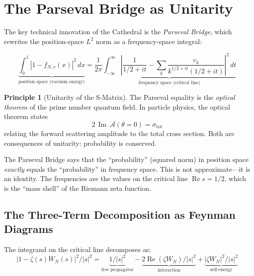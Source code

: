 \documentclass[11pt,a4paper]{article}
\theoremstyle{definition}
\newtheorem{principle}[definition]{Principle}
\newcommand{\re}{\operatorname{Re}}
\newcommand{\im}{\operatorname{Im}}
\begin{document}
\section{The Parseval Bridge as Unitarity}
\label{sec:parseval}

The key technical innovation of the Cathedral is the \emph{Parseval Bridge},
which rewrites the position-space $L^2$ norm as a frequency-space integral:

\[
  \underbrace{\int_0^1 |1 - f_{N,v}(x)|^2\,dx}_{\text{position space (vacuum energy)}}
  = \frac{1}{2\pi}\underbrace{\int_{-\infty}^{\infty}
  \left|\frac{1}{1/2+it} - \sum_k \frac{v_k}{k^{1/2+it}(1/2+it)}\right|^2\,dt}_{\text{frequency space (critical line)}}
\]

\begin{principle}[Unitarity of the S-Matrix]
The Parseval equality is the \emph{optical theorem} of the prime number
quantum field. In particle physics, the optical theorem states
\[
  2\,\im\,\mathcal{A}(\theta=0) = \sigma_{\mathrm{tot}}
\]
relating the forward scattering amplitude to the total cross section.
Both are consequences of unitarity: probability is conserved.

The Parseval Bridge says that the ``probability'' (squared norm) in
position space \emph{exactly} equals the ``probability'' in frequency
space. This is not approximate---it is an identity. The frequencies
are the values on the critical line $\re s = 1/2$, which is the
``mass shell'' of the Riemann zeta function.
\end{principle}

\subsection{The Three-Term Decomposition as Feynman Diagrams}

The integrand on the critical line decomposes as:
\[
  |1 - \zeta(s)W_N(s)|^2 / |s|^2
  = \underbrace{1/|s|^2}_{\text{free propagator}}
  - \underbrace{2\re(\zeta W_N)/|s|^2}_{\text{interaction}}
  + \underbrace{|\zeta W_N|^2/|s|^2}_{\text{self-energy}}
\]
\end{document}
